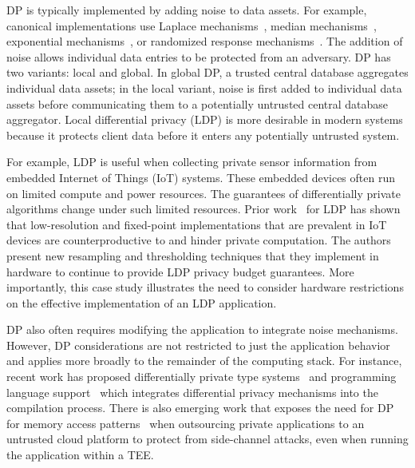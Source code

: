 DP is typically implemented by adding noise to data assets.
For example, canonical implementations use Laplace mechanisms~\cite{dwork2006calibrating, sarathy2011evaluating}, median mechanisms~\cite{roth2009median}, exponential mechanisms~\cite{mcsherry2007mechanism}, or randomized response mechanisms~\cite{erlingsson2014rappor}.
The addition of noise allows individual data entries to be protected from an adversary.
DP has two variants: local and global.
In global DP, a trusted central database aggregates individual data assets; in the local variant, noise is first added to individual data assets before communicating them to a potentially untrusted central database aggregator.
Local differential privacy (LDP) is more desirable in modern systems because it protects client data before it enters any potentially untrusted system.

For example, LDP is useful when collecting private sensor information from embedded Internet of Things (IoT) systems.
These embedded devices often run on limited compute and power resources.
The guarantees of differentially private algorithms change under such limited resources.
Prior work~\cite{choi2018guaranteeing} for LDP has shown that low-resolution and fixed-point implementations that are prevalent in IoT devices are counterproductive to and hinder private computation.
The authors present new resampling and thresholding techniques that they implement in hardware to continue to provide LDP privacy budget guarantees.
More importantly, this case study illustrates the need to consider hardware restrictions on the effective implementation of an LDP application.

DP also often requires modifying the application to integrate noise mechanisms.
However, DP considerations are not restricted to just the application behavior and applies more broadly to the remainder of the computing stack.
For instance, recent work has proposed differentially private type systems~\cite{reed2010distance, gaboardi2013linear, near2019duet} and programming language support~\cite{barthe2016programming, mcsherry2009privacy, roy2010airavat} which integrates differential privacy mechanisms into the compilation process.
There is also emerging work that exposes the need for DP for memory access patterns~\cite{chan2019foundations, kellaris2017accessing} when outsourcing private applications to an untrusted cloud platform to protect from side-channel attacks, even when running the application within a TEE.

